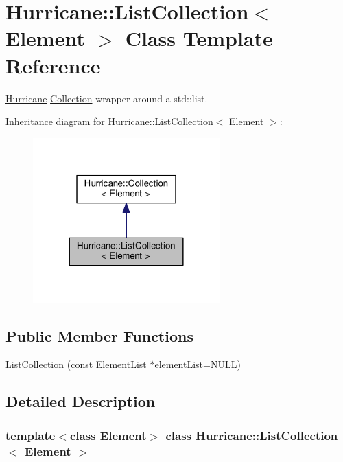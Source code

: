 \hypertarget{classHurricane_1_1ListCollection}{}\section{Hurricane\+:\+:List\+Collection$<$ Element $>$ Class Template Reference}
\label{classHurricane_1_1ListCollection}


\hyperlink{namespaceHurricane}{Hurricane} \hyperlink{classHurricane_1_1Collection}{Collection} wrapper around a std\+::list.  




Inheritance diagram for Hurricane\+:\+:List\+Collection$<$ Element $>$\+:\nopagebreak
\begin{figure}[H]
\begin{center}
\leavevmode
\includegraphics[width=204pt]{classHurricane_1_1ListCollection__inherit__graph}
\end{center}
\end{figure}
\subsection*{Public Member Functions}
\begin{DoxyCompactItemize}
\item 
\hyperlink{classHurricane_1_1ListCollection_a11d0b27c9b01f16fe9ac9da091575e7c}{List\+Collection} (const Element\+List $\ast$element\+List=N\+U\+LL)
\end{DoxyCompactItemize}


\subsection{Detailed Description}
\subsubsection*{template$<$class Element$>$\newline
class Hurricane\+::\+List\+Collection$<$ Element $>$}

